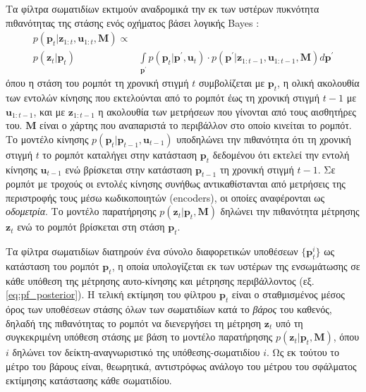 Τα φίλτρα σωματιδίων εκτιμούν αναδρομικά την εκ των υστέρων πυκνότητα
πιθανότητας της στάσης ενός οχήματος βάσει λογικής Bayes
\cite{thrun2005probabilistic}:
\begin{align}
  \label{eq:pf_posterior}
  p(\bm{p}_t | \bm{z}_{1:t}, \bm{u}_{1:t}, \bm{M}) \propto & \nonumber \\
    p(\bm{z}_t | \bm{p}_t) &\int\limits_{\bm{p}^{\prime}} p(\bm{p}_t | \bm{p}^{\prime}, \bm{u}_t) \cdot p(\bm{p}^{\prime} | \bm{z}_{1:t-1}, \bm{u}_{1:t-1}, \bm{M}) d\bm{p}^{\prime}
\end{align}
όπου η στάση του ρομπότ τη χρονική στιγμή $t$ συμβολίζεται με $\bm{p}_t$, η
ολική ακολουθία των εντολών κίνησης που εκτελούνται από το ρομπότ έως τη
χρονική στιγμή $t-1$ με $\bm{u}_{1:t-1}$, και με $\bm{z}_{1:t-1}$ η ακολουθία
των μετρήσεων που γίνονται από τους αισθητήρες του. $\bm{M}$ είναι ο χάρτης που
αναπαριστά το περιβάλλον στο οποίο κινείται το ρομπότ. Το μοντέλο κίνησης
$p(\bm{p}_t | \bm{p}_{t-1}, \bm{u}_{t-1})$ υποδηλώνει την πιθανότητα ότι τη
χρονική στιγμή $t$ το ρομπότ καταλήγει στην κατάσταση $\bm{p}_t$ δεδομένου ότι
εκτελεί την εντολή κίνησης $\bm{u}_{t-1}$ ενώ βρίσκεται στην κατάσταση
$\bm{p}_{t-1}$ τη χρονική στιγμή $t-1$. Σε ρομπότ με τροχούς οι εντολές κίνησης
συνήθως αντικαθίστανται από μετρήσεις της περιστροφής τους μέσω κωδικοποιητών
(encoders), οι οποίες αναφέρονται ως \textit{οδομετρία}. Το μοντέλο παρατήρησης
$p(\bm{z}_t | \bm{p}_t, \bm{M})$ δηλώνει την πιθανότητα μέτρησης $\bm{z}_t$ ενώ
το ρομπότ βρίσκεται στη στάση $\bm{p}_t$.

Τα φίλτρα σωματιδίων διατηρούν ένα σύνολο διαφορετικών υποθέσεων
$\{\bm{p}_t^i\}$ ως κατάσταση του ρομπότ $\bm{p}_t$, η οποία υπολογίζεται εκ
των υστέρων της ενσωμάτωσης σε κάθε υπόθεση της μέτρησης αυτο-κίνησης και
μέτρησης περιβάλλοντος (εξ. \ref{eq:pf_posterior}). Η τελική εκτίμηση του
φίλτρου $\bm{p}_t$ είναι ο σταθμισμένος μέσος όρος των υποθέσεων στάσης όλων
των σωματιδίων κατά το \textit{βάρος} του καθενός, δηλαδή της πιθανότητας το
ρομπότ να διενεργήσει τη μέτρηση $\bm{z}_t$ υπό τη συγκεκριμένη υπόθεση στάσης
με βάση το μοντέλο παρατήρησης $p(\bm{z}_t | \bm{p}_t, \bm{M})$, όπου $i$
δηλώνει τον δείκτη-αναγνωριστικό της υπόθεσης-σωματιδίου $i$. Ως εκ τούτου το
μέτρο του βάρους είναι, θεωρητικά, αντιστρόφως ανάλογο του μέτρου του σφάλματος
εκτίμησης κατάστασης κάθε σωματιδίου.

